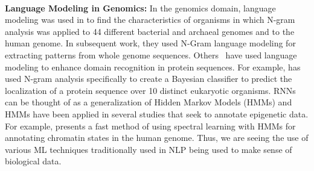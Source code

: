 \\
\textbf{Language Modeling in Genomics:} In the genomics domain, language modeling was used in \cite{ganapathiraju2002comparative} to find the characteristics of organisms in which N-gram analysis was applied to 44 different bacterial and archaeal genomes and to the human genome. 
In subsequent work, they used N-Gram language modeling for extracting patterns from whole genome sequences. Others~\cite{coin2003enhanced} have used language modeling to enhance domain recognition in protein sequences. For example, \cite{king2007ngloc} has used N-gram analysis specifically to create a Bayesian classifier to predict the localization of a protein sequence over 10 distinct eukaryotic organisms. 
RNNs can be thought of as a generalization of Hidden Markov Models (HMMs) and HMMs have been applied in several studies that seek to annotate epigenetic data. For example, \cite{song2015spectacle} presents a fast method of using spectral learning with HMMs for annotating chromatin states in the human genome.
Thus, we are seeing the use of various ML techniques traditionally used in NLP being used to make sense of biological data.  
\vspace{-5pt}
